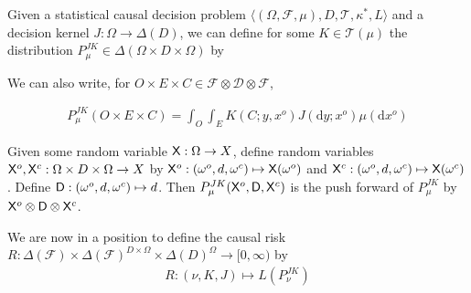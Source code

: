 \begin{definition}
Given a statistical causal decision problem $\langle (\Omega,\mathcal{F},\mu), D, \mathscr{T},\kappa^*, L\rangle$ and a decision kernel $J:\Omega \to \Delta(D)$, we can define for some $K\in \mathscr{T}(\mu)$ the distribution $P^{J K}_\mu\in \Delta(\Omega \times D \times \Omega)$ by

\begin{center}
\end{center}

We can also write, for $O\times E\times C\in \mathcal{F}\otimes \mathcal{D} \otimes\mathcal{F}$,

\begin{align}
    P^{J K}_\mu (O\times E\times C) = \int_O \int_E  K(C ;y,x^o) J(\mathrm{d}y; x^o) \mu(\mathrm{d}x^o)
\end{align}

Given some random variable $\mathsf{X}:\Omega\to X$, define random variables $\mathsf{X}^o,\mathsf{X}^c:\Omega\times D\times \Omega\to X$ by $\mathsf{X}^o:(\omega^o,d,\omega^c)\mapsto \mathsf{X}(\omega^o)$ and $\mathsf{X}^c:(\omega^o,d,\omega^c)\mapsto \mathsf{X}(\omega^c)$. Define $\mathsf{D}:(\omega^o,d,\omega^c)\mapsto d$. Then $P^{J K}_\mu(\mathsf{X}^o,\mathsf{D},\mathsf{X}^c)$ is the push forward of $P^{J K}_\mu$ by $\mathsf{X}^o\otimes\mathsf{D}\otimes\mathsf{X}^c$.



\end{definition}

We are now in a position to define the causal risk $R:\Delta(\mathcal{F})\times  \Delta(\mathcal{F})^{D\times \Omega} \times \Delta(D)^{\Omega}\to [0,\infty)$ by
\begin{align}
    R:(\nu,K,J)\mapsto L(P^{J K}_\nu) \label{eq:risk}
\end{align}


